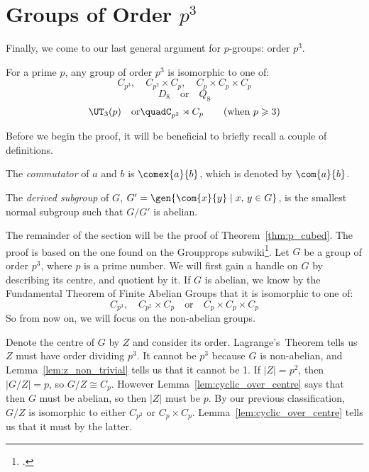 \section{Groups of Order \(p^3\)}
Finally, we come to our last general argument for \(p\)-groups: order \(p^3\).

\begin{theorem}\label{thm:p_cubed}
    For a prime \(p\), any group of order \(p^3\) is isomorphic to one of:
    \[%
        C_{p^3}, \quad%
        C_{p^2} \times C_p, \quad%
        C_p \times C_p \times C_p
    \]
    \[
        D_8 \quad \text{or} \quad%
        Q_8 \tag{when \(p = 2\)}
    \]
    \[
        \UT_3(p) \quad \text{or} \quad%
        C_{p^2} \rtimes C_p \tag{when \(p \geqslant 3\)}
    \]
\end{theorem}

Before we begin the proof, it will be beneficial to briefly recall a couple of definitions.
\begin{definition}
    The \emph{commutator} of \(a\) and \(b\) is \(\comex{a}{b}\), which is denoted by \(\com{a}{b}\).

    The \emph{derived subgroup} of \(G\), \(G' = \gen{\com{x}{y} \mid x,\,y \in G}\), is the smallest normal
    subgroup such that \(G/G'\) is abelian.
\end{definition}

The remainder of the section will be the proof of Theorem~\ref{thm:p_cubed}.
The proof is based on the one found on the Groupprops subwiki\footcite{pcubed}.
Let \(G\) be a group of order \(p^3\), where \(p\) is a prime number.
We will first gain a handle on \(G\) by describing its centre, and quotient by it.
If \(G\) is abelian, we know by the Fundamental Theorem of Finite Abelian Groups that it is isomorphic to one of:
    \[C_{p^3}, \quad C_{p^2} \times C_p \quad \text{or} \quad C_p \times C_p \times C_p
    \tag{\star}\label{eqn:p_cubed_abelian}\]
So from now on, we will focus on the non-abelian groups.

Denote the centre of \(G\) by \(Z\) and consider its order.
Lagrange's~Theorem tells us \(Z\) must have order dividing \(p^3\).
It cannot be \(p^3\) because \(G\) is non-abelian, and Lemma~\ref{lem:z_non_trivial} tells us that it cannot be 1.
If \(|Z| = p^2\), then \(|G/Z| = p\), so \(G/Z \cong C_p\).
However Lemma~\ref{lem:cyclic_over_centre} says that then \(G\) must be abelian, so then \(|Z|\) must be \(p\).
By our previous classification, \(G/Z\) is isomorphic to either \(C_{p^2}\) or \(C_p \times C_p\).
Lemma~\ref{lem:cyclic_over_centre} tells us that it must by the latter.

